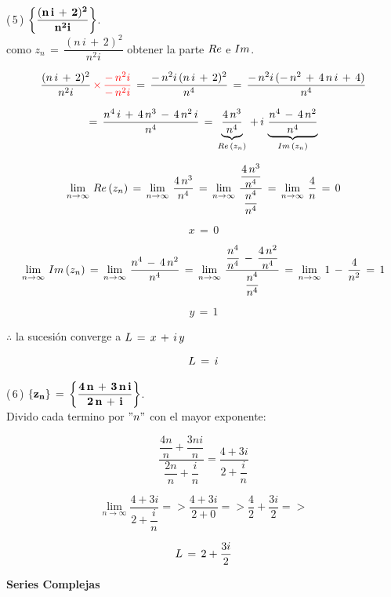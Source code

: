 \documentclass[a4paper,11pt,openany]{book}
\begin{document}
\textcolor{ao(english)}{(\,5\,)} $\bf{\left\{\dfrac{(n\,i\,+\,2)^{2}}{n^{2}i}\right\}}$.\\

\textcolor{ao(english)}{} como $z_{n}\,=\,\dfrac{(n\,i\,+\,2)^{2}}{n^{2}i}$ obtener la parte $\mathnormal{Re}$ e $\mathnormal{Im}$.

$$\dfrac{(n\,i\,+\,2)^{2}}{n^{2}i}\,\textcolor{red}{\times\,\dfrac{-\,n^{2}i}{-\,n^{2}i}}\,=\,\dfrac{-\,n^{2}i\,(n\,i\,+\,2)^{2}}{n^{4}}\,=\,\dfrac{-\,n^{2}i\,(-\,n^{2}\,+\,4\,n\,i\,+\,4)}{n^{4}}$$

$$=\,\dfrac{n^{4}\,i\,+\,4\,n^{3}\,-\,4\,n^{2}\,i}{n^{4}}\,=\,\underbrace{\dfrac{4\,n^{3}}{n^{4}}}_{\mathnormal{Re}\,(z_{n})}\,+\,i\,\underbrace{\dfrac{n^{4}\,-\,4\,n^{2}}{n^{4}}}_{\mathnormal{Im}\,(z_{n})}$$

$$\displaystyle\lim_{n \to \infty}\,\mathnormal{Re}\,(z_{n})\,=\,\displaystyle\lim_{n \to \infty}\,\dfrac{4\,n^{3}}{n^{4}}\,=\,\displaystyle\lim_{n \to \infty}\,\dfrac{\dfrac{4\,n^{3}}{n^{4}}}{\dfrac{n^{4}}{n^{4}}}\,=\,\displaystyle\lim_{n \to \infty}\,\dfrac{4}{n}\,=\,0$$

$$x\,=\,0$$

$$\displaystyle\lim_{n \to \infty}\,\mathnormal{Im}\,(z_{n})\,=\,\displaystyle\lim_{n \to \infty}\,\dfrac{n^{4}\,-\,4\,n^{2}}{n^{4}}\,=\,\displaystyle\lim_{n \to \infty}\,\dfrac{\dfrac{n^{4}}{n^{4}}\,-\,\dfrac{4\,n^{2}}{n^{4}}}{\dfrac{n^{4}}{n^{4}}}\,=\,\displaystyle\lim_{n \to \infty}\,1\,-\,\dfrac{4}{n^{2}}\,=\,1$$

$$y\,=\,1$$

$\therefore$ la sucesión converge a $\mathnormal{L}\,=\,x\,+\,i\,y$

$$\mathnormal{L}\,=\,i$$

\textcolor{ao(english)}{(\,6\,)} $\bf{\{z_{n}\}\,=\,\left\{\dfrac{4\,n\,+\,3\,n\,i}{2\,n\,+\,i}\right\}}$.\\

Divido cada termino por $"n"$ con el mayor exponente:

$$\dfrac{\dfrac{4n}{n}+\dfrac{3ni}{n}}{\dfrac{2n}{n}+\dfrac{i}{n}} = \dfrac{ 4 +3i }{2+\dfrac{i}{n}} $$

$$\displaystyle\lim_{n \to \infty} \dfrac{ 4 +3i }{2+\dfrac{i}{n}} => \dfrac{ 4 +3i }{2+0} => \dfrac{4}{2}+\dfrac{3i}{2} =>  $$

$$\mathnormal{L}\,=\, 2+\dfrac{3i}{2}$$

\begin{center}
\textbf{Series Complejas}
\end{center}
\end{document}
